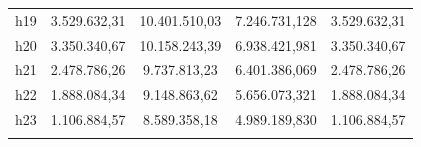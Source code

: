 \documentclass[conference, 10pt]{IEEEtran}
\begin{document}
\begin{table}[!htbp]
\begin{tabular}{@{\extracolsep{5pt}} ccccc}
h19 & 3.529.632,31 & 10.401.510,03 & 7.246.731,128& 3.529.632,31 \\ 
h20 & 3.350.340,67 & 10.158.243,39 & 6.938.421,981& 3.350.340,67 \\ 
h21 & 2.478.786,26 & 9.737.813,23 & 6.401.386,069& 2.478.786,26 \\ 
h22 & 1.888.084,34 & 9.148.863,62 & 5.656.073,321& 1.888.084,34 \\ 
h23 & 1.106.884,57 & 8.589.358,18 & 4.989.189,830& 1.106.884,57 
\\ \hline \\[-1.8ex] 
\end{tabular} 
\label{tab_16}
\end{table}

\end{document}
